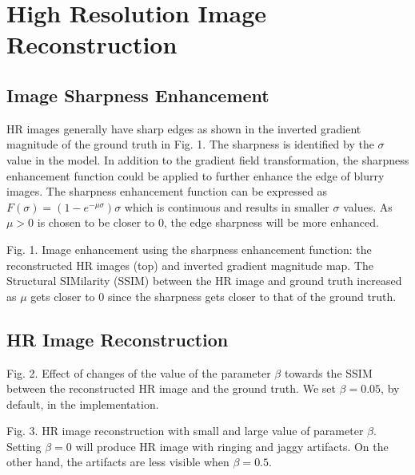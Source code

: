 \documentclass[a4paper,11pt]{article}
\begin{document}
\section{High Resolution Image Reconstruction}

\subsection{Image Sharpness Enhancement}
HR images generally have sharp edges as shown in the inverted gradient magnitude of the ground truth in Fig. 1. The sharpness is identified by the $\sigma$ value in the model. In addition to the gradient field transformation, the sharpness enhancement function could be applied to further enhance the edge of blurry images. The sharpness enhancement function can be expressed as $F(\sigma) = (1-e^{-\mu\sigma})\sigma$ which is continuous and results in smaller $\sigma$ values. As $\mu > 0$ is chosen to be closer to 0, the edge sharpness will be more enhanced.

\begin{center}
	\scriptsize
	Fig. 1. Image enhancement using the sharpness enhancement function: the reconstructed HR images (top) and inverted gradient magnitude map. The Structural SIMilarity (SSIM) \cite{ssim04} between the HR image and ground truth increased as $\mu$ gets closer to 0 since the sharpness gets closer to that of the ground truth.
\end{center}

\subsection{HR Image Reconstruction}


\begin{center}
	\scriptsize
	Fig. 2. Effect of changes of the value of the parameter $\beta$ towards the SSIM between the reconstructed HR image and the ground truth. We set $\beta = 0.05$, by default, in the implementation.
\end{center}

\begin{center}
	\scriptsize
	Fig. 3. HR image reconstruction with small and large value of parameter $\beta$. Setting $\beta = 0$ will produce HR image with ringing and jaggy artifacts. On the other hand, the artifacts are less visible when $\beta = 0.5$.
\end{center}
\end{document}

